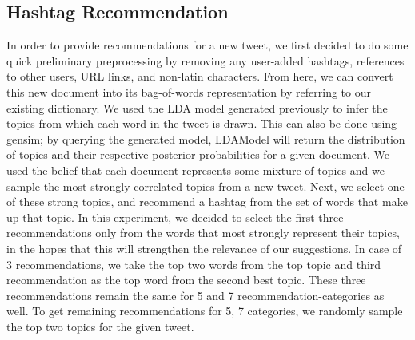 \documentclass{acm_proc_article-sp}
\begin{document}
\subsection{Hashtag Recommendation}
\hspace*{5mm}In order to provide recommendations for a new tweet, we first decided to do some quick preliminary preprocessing by removing any user-added hashtags, references to other users, URL links, and non-latin characters. From here, we can convert this new document into its bag-of-words representation by referring to our existing dictionary. We used the LDA model generated previously to infer the topics from which each word in the tweet is drawn. This can also be done using gensim; by querying the generated model, LDAModel will return the distribution of topics and their respective posterior probabilities for a given document. We used the belief that each document represents some mixture of topics and we sample the most strongly correlated topics from a new tweet. Next, we select one of these strong topics, and recommend a hashtag from the set of words that make up that topic. In this experiment, we decided to select the first three recommendations only from the words that most strongly represent their topics, in the hopes that this will strengthen the relevance of our suggestions. In case of 3 recommendations, we take the top two words from the top topic and third recommendation as the top word from the second best topic. These three recommendations remain the same for 5 and 7 recommendation-categories as well. To get remaining recommendations for 5, 7 categories, we randomly sample the top two topics for the given tweet.\\
\end{document}
